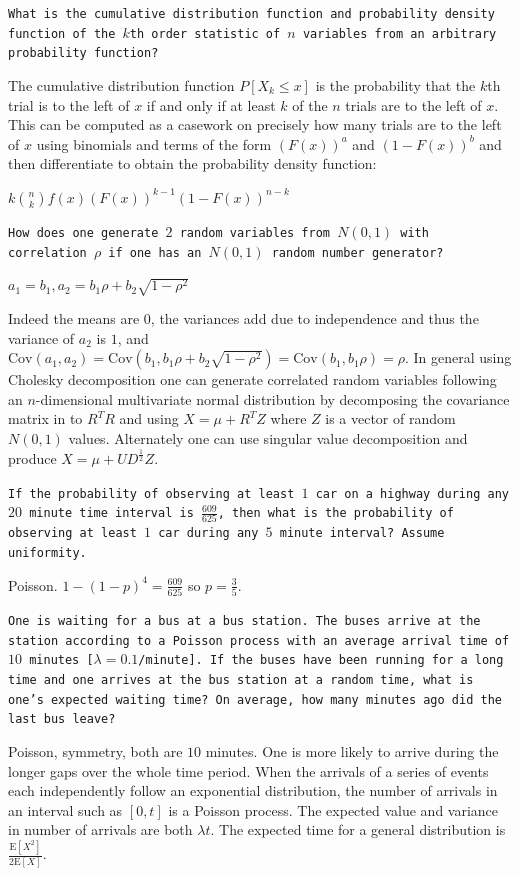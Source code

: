 \texttt{What is the cumulative distribution function and probability density function of the $k$th order statistic of $n$ variables from an arbitrary probability function?}

The cumulative distribution function $P[X_k \le x]$ is the probability that the $k$th trial is to the left of $x$ if and only if at least $k$ of the $n$ trials are to the left of $x$. This can be computed as a casework on precisely how many trials are to the left of $x$ using binomials and terms of the form $(F(x))^a$ and $(1-F(x))^b$ and then differentiate to obtain the probability density function:

$\boxed{k \binom{n}{k} f(x)(F(x))^{k-1}(1-F(x))^{n-k}}$

\texttt{How does one generate $2$ random variables from $N(0,1)$ with correlation $\rho$ if one has an $N(0,1)$ random number generator?}

$\boxed{a_1 = b_1, a_2 = b_1 \rho + b_2 \sqrt{1-\rho^2}}$

Indeed the means are $0$, the variances add due to independence and thus the variance of $a_2$ is $1$, and $\text{Cov}(a_1,a_2) = \text{Cov}(b_1,b_1 \rho + b_2 \sqrt{1-\rho^2}) = \text{Cov}(b_1,b_1 \rho) = \rho$. In general using Cholesky decomposition one can generate correlated random variables following an $n$-dimensional multivariate normal distribution by decomposing the covariance matrix in to $R^T R$ and using $X=\mu+R^T Z$ where $Z$ is a vector of random $N(0,1)$ values. Alternately one can use singular value decomposition and produce $X=\mu+UD^{\frac{1}{2}}Z$.

\texttt{If the probability of observing at least $1$ car on a highway during any $20$ minute time interval is $\frac{609}{625}$, then what is the probability of observing at least $1$ car during any $5$ minute interval? Assume uniformity.}

Poisson. $1-(1-p)^4 = \frac{609}{625}$ so $p = \boxed{\frac{3}{5}}$.

\texttt{One is waiting for a bus at a bus station. The buses arrive at the station according to a Poisson process with an average arrival time of $10$ minutes [$\lambda = 0.1$/minute]. If the buses have been running for a long time and one arrives at the bus station at a random time, what is one's expected waiting time? On average, how many minutes ago did the last bus leave?}

Poisson, symmetry, both are $\boxed{10}$ minutes. One is more likely to arrive during the longer gaps over the whole time period. When the arrivals of a series of events each independently follow an exponential distribution, the number of arrivals in an interval such as $[0,t]$ is a Poisson process. The expected value and variance in number of arrivals are both $\lambda t$. The expected time for a general distribution is $\boxed{\frac{\text{E}[X^2]}{2\text{E}[X]}}$.

